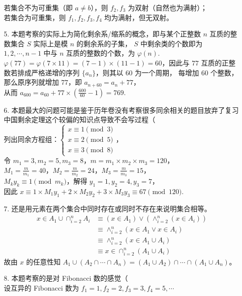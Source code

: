 \documentclass{ctexbook}
\begin{document}
\begin{enumerate}
    若集合不为可重集（即 $a\neq b$），则 $f_2,f_3$ 为双射（自然也为满射）； \\
    若集合为可重集，则 $f_1,f_2,f_3,f_4$ 均为满射，但无双射。
    \item[5.] 本题考察的实际上为简化剩余系/缩系的概念，即与某个正整数 $n$ 互质的整数集合 $S$ 实际上是模 $n$ 的剩余系的子集，
    $S$ 中剩余类的个数即为 $1,2,\cdots,n-1$ 中与 $n$ 互质的整数的个数，为 $\varphi(n)$. \\
    $\varphi(77)=\varphi(7\times 11)=(7-1)\times(11-1)=60$，因此与 $77$ 互质的正整数若排成严格递增的序列 $\{a_n\}$，则其以 $60$ 为一个周期，
    每增加 $60$ 个整数，那么原序列就增加 $77$，即 $a_{n+60}=a_n+77$，\\
    从而 $a_{600}=a_{60}+77\times (\frac{600}{60}-1)=769$.
    \item[6.] 本题最大的问题可能是鉴于历年卷没有考察很多同余相关的题目放弃了复习中国剩余定理这个较偏的知识点导致不会写过程（ \\
    列出同余方程组：$\begin{cases}
        x\equiv 1\pmod{3} \\
        x\equiv 2\pmod{5} \\
        x\equiv 3\pmod{8}
    \end{cases}$，\\
    令 $m_1=3,m_2=5,m_3=8$，$m=m_1\times m_2\times m_3=120$，\\
    $M_1=\frac{m}{m_1}=40$，$M_2=\frac{m}{m_2}=24$，$M_3=\frac{m}{m_3}=15$，\\
    $M_ky_k\equiv 1\pmod{m_k}$，解得 $y_1=1,y_2=4,y_3=7$，\\
    因此 $x\equiv 1\times M_1y_1+2\times M_2y_2+3\times M_3y_3\equiv 67\pmod{120}$.
    \item[7.] 还是用元素在两个集合中同时存在或同时不存在来说明集合相等。
    \begin{align*} x\in A_1\cup\cap_{i=2}^n A_i &\equiv (x\in A_1) \lor (\land_{i=2}^n (x\in A_i)) \\
        &\equiv \land_{i=2}^n (x\in A_1 \lor x\in A_i) \\
        &\equiv \land_{i=2}^n (x\in A_1\cup A_i) \\
        &\equiv x\in \cap_{i=2}^n (A_1\cup A_i)
    \end{align*}故由 $x$ 的任意性知 $A_1\cup(A_2\cap\cdots\cap A_n)=(A_1\cup A_2)\cap\cdots\cap(A_1\cup A_n)$。
    \item[8.] 本题考察的是对 Fibonacci 数的感觉（ \\
    设互异的 Fibonacci 数为 $f_1=1,f_2=2,f_3=3,f_4=5,\cdots$ \\

\end{enumerate}
\end{document}
